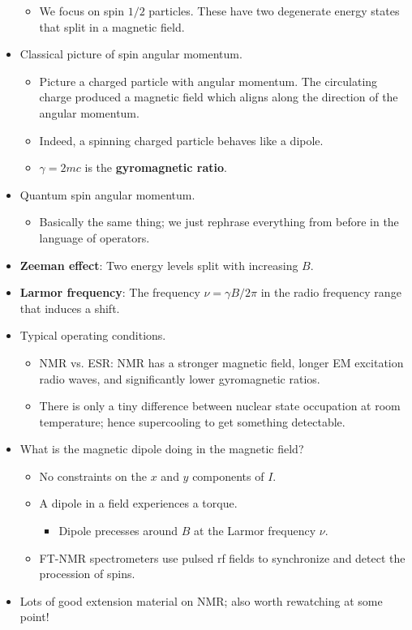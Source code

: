 \documentclass[../notes.tex]{subfiles}
\begin{document}
\begin{itemize}
\begin{itemize}
\begin{itemize}
        \end{itemize}
        \item We focus on spin $1/2$ particles. These have two degenerate energy states that split in a magnetic field.
    \end{itemize}
    \item Classical picture of spin angular momentum.
    \begin{itemize}
        \item Picture a charged particle with angular momentum. The circulating charge produced a magnetic field which aligns along the direction of the angular momentum.
        \item Indeed, a spinning charged particle behaves like a dipole.
        \item $\gamma=2mc$ is the \textbf{gyromagnetic ratio}.
    \end{itemize}
    \item Quantum spin angular momentum.
    \begin{itemize}
        \item Basically the same thing; we just rephrase everything from before in the language of operators.
    \end{itemize}
    \item \textbf{Zeeman effect}: Two energy levels split with increasing $B$.
    \item \textbf{Larmor frequency}: The frequency $\nu=\gamma B/2\pi$ in the radio frequency range that induces a shift.
    \item Typical operating conditions.
    \begin{itemize}
        \item NMR vs. ESR: NMR has a stronger magnetic field, longer EM excitation radio waves, and significantly lower gyromagnetic ratios.
        \item There is only a tiny difference between nuclear state occupation at room temperature; hence supercooling to get something detectable.
    \end{itemize}
    \item What is the magnetic dipole doing in the magnetic field?
    \begin{itemize}
        \item No constraints on the $x$ and $y$ components of $I$.
        \item A dipole in a field experiences a torque.
        \begin{itemize}
            \item Dipole precesses around $B$ at the Larmor frequency $\nu$.
        \end{itemize}
        \item FT-NMR spectrometers use pulsed rf fields to synchronize and detect the procession of spins.
    \end{itemize}
    \item Lots of good extension material on NMR; also worth rewatching at some point!
\end{itemize}
\end{document}
